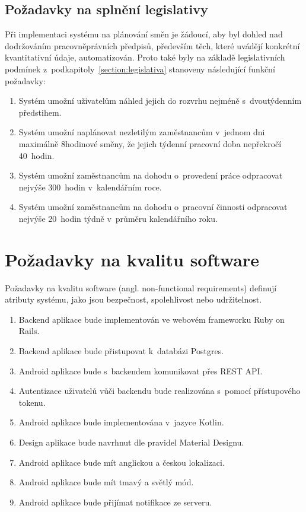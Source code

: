 \documentclass[twoside]{ctuthesis}
\begin{document}
\subsection{Požadavky na splnění legislativy}
Při implementaci systému na plánování směn je žádoucí, aby byl dohled nad dodržováním pracovněprávních předpisů, především těch, které uvádějí konkrétní kvantitativní údaje, automatizován. Proto také byly na základě legislativních podmínek z~podkapitoly~\ref{section:legislativa} stanoveny následující funkční požadavky:

\begin{enumerate}[label=\textbf{L\arabic*.}]
	\item Systém umožní uživatelům náhled jejich do rozvrhu nejméně s~dvou\-tý\-den\-ním předstihem.
	\item Systém umožní naplánovat nezletilým zaměstnancům v~jednom dni maximálně 8hodinové směny, že jejich týdenní pracovní doba nepřekročí 40~hodin.
	\item Systém umožní zaměstnancům na dohodu o~provedení práce odpracovat nejvýše 300~hodin v~kalendářním roce.
	\item Systém umožní zaměstnancům na dohodu o~pracovní činnosti odpracovat nejvýše 20~hodin týdně v~průměru kalendářního roku.
\end{enumerate}

\section{Požadavky na kvalitu software}
Požadavky na kvalitu software (angl. non-functional requirements) definují atributy systému, jako jsou bezpečnost, spolehlivost nebo udržitelnost.

\begin{enumerate}[label=\textbf{N\arabic*.}]
	\item Backend aplikace bude implementován ve webovém frameworku Ruby on Rails.
	\item Backend aplikace bude přistupovat k~databázi Postgres.
	\item Android aplikace bude s~backendem komunikovat přes REST API.
	\item Autentizace uživatelů vůči backendu bude realizována s~pomocí přís\-tu\-po\-vé\-ho tokenu.
	\item Android aplikace bude implementována v~jazyce Kotlin.
	\item Design aplikace bude navrhnut dle pravidel Material Designu.
	\item Android aplikace bude mít anglickou a českou lokalizaci.
	\item Android aplikace bude mít tmavý a světlý mód.
	\item Android aplikace bude přijímat notifikace ze serveru.
\end{enumerate}
\newpage
\end{document}
